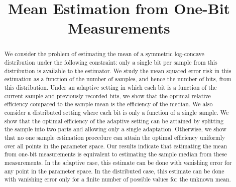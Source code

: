 \documentclass[letterpaper, 11pt]{IEEEtran}      %
\author{
    \IEEEauthorblockN{
Alon Kipnis\IEEEauthorrefmark{1} and   
    John C. Duchi\IEEEauthorrefmark{1}\IEEEauthorrefmark{2}  \\}
    \IEEEauthorblockA{\IEEEauthorrefmark{1}Stanford University, Department of Statistics \\}
    \IEEEauthorblockA{\IEEEauthorrefmark{2}Stanford University, Department of Electrical Engineering. }
}
\title{\LARGE \bf Mean Estimation from One-Bit Measurements}
\begin{document}
\graphicspath{{./Figs/}}
\maketitle
\thispagestyle{empty}
\pagestyle{empty}

\begin{abstract}
We consider the problem of estimating the mean of a symmetric log-concave distribution under the following constraint: only a single bit per sample from this distribution is available to the estimator. We study the mean squared error risk in this estimation as a function of the number of samples, and hence the number of bits, from this distribution. 
%
Under an adaptive setting in which each bit is a function of the current sample and previously recorded bits, we show that the optimal relative efficiency compared to the sample mean is the efficiency of the median. %
%
We also consider a distributed setting where each bit is only a function of a single sample. We show that the optimal efficiency of the adaptive setting can be attained by splitting the sample into two parts and allowing only a single adaptation. Otherwise, we show that no one sample estimation procedure can attain the optimal efficiency uniformly over all points in the parameter space.
%
%
Our results indicate that estimating the mean from one-bit measurements is equivalent to estimating the sample median from these measurements. In the adaptive case, this estimate can be done with vanishing error for any point in the parameter space. In the distributed case, this estimate can be done with vanishing error only for a finite number of possible values for the unknown mean. 
\end{abstract}



\end{document}
